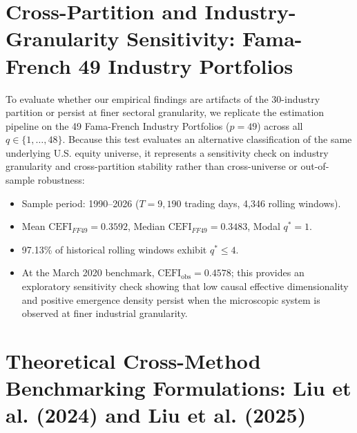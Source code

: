 \documentclass[12pt]{article}
\begin{document}
\section{Cross-Partition and Industry-Granularity Sensitivity: Fama-French 49 Industry Portfolios}
\label{app:ff49}

To evaluate whether our empirical findings are artifacts of the 30-industry partition or persist at finer sectoral granularity, we replicate the estimation pipeline on the 49 Fama-French Industry Portfolios ($p=49$) across all $q \in \{1, \dots, 48\}$. Because this test evaluates an alternative classification of the same underlying U.S. equity universe, it represents a sensitivity check on industry granularity and cross-partition stability rather than cross-universe or out-of-sample robustness:
\begin{itemize}
    \item Sample period: 1990--2026 ($T = 9,190$ trading days, 4,346 rolling windows).
    \item Mean $\mathrm{CEFI}_{FF49} = 0.3592$, Median $\mathrm{CEFI}_{FF49} = 0.3483$, Modal $q^* = 1$.
    \item 97.13\% of historical rolling windows exhibit $q^* \le 4$.
    \item At the March 2020 benchmark, $\mathrm{CEFI}_{\text{obs}} = 0.4578$; this provides an exploratory sensitivity check showing that low causal effective dimensionality and positive emergence density persist when the microscopic system is observed at finer industrial granularity.
\end{itemize}

\section{Theoretical Cross-Method Benchmarking Formulations: Liu et al. (2024) and Liu et al. (2025)}
\label{app:cross_method_formulations}
\end{document}
